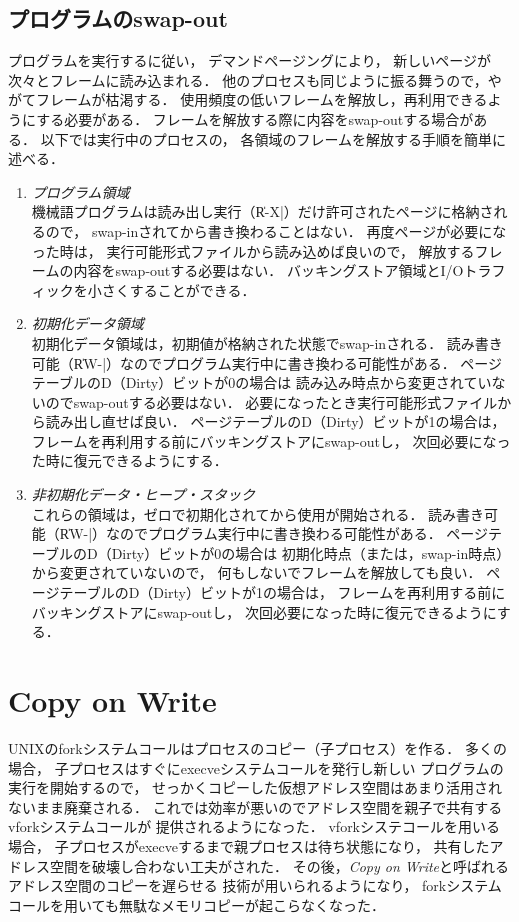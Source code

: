 \subsection{プログラムのswap-out}
プログラムを実行するに従い，
デマンドページングにより，
新しいページが次々とフレームに読み込まれる．
他のプロセスも同じように振る舞うので，やがてフレームが枯渇する．
使用頻度の低いフレームを解放し，再利用できるようにする必要がある．
フレームを解放する際に内容をswap-outする場合がある．
以下では実行中のプロセスの，
各領域のフレームを解放する手順を簡単に述べる．

\begin{enumerate}
\item \emph{プログラム領域} \\
機械語プログラムは読み出し実行（\|R-X|）だけ許可されたページに格納されるので，
swap-inされてから書き換わることはない．
再度ページが必要になった時は，
実行可能形式ファイルから読み込めば良いので，
解放するフレームの内容をswap-outする必要はない．
バッキングストア領域とI/Oトラフィックを小さくすることができる．

\item \emph{初期化データ領域} \\
初期化データ領域は，初期値が格納された状態でswap-inされる．
読み書き可能（\|RW-|）なのでプログラム実行中に書き換わる可能性がある．
ページテーブルのD（Dirty）ビットが0の場合は
読み込み時点から変更されていないのでswap-outする必要はない．
必要になったとき実行可能形式ファイルから読み出し直せば良い．
ページテーブルのD（Dirty）ビットが1の場合は，
フレームを再利用する前にバッキングストアにswap-outし，
次回必要になった時に復元できるようにする．

\item \emph{非初期化データ・ヒープ・スタック} \\
これらの領域は，ゼロで初期化されてから使用が開始される．
読み書き可能（\|RW-|）なのでプログラム実行中に書き換わる可能性がある．
ページテーブルのD（Dirty）ビットが0の場合は
初期化時点（または，swap-in時点）から変更されていないので，
何もしないでフレームを解放しても良い．
ページテーブルのD（Dirty）ビットが1の場合は，
フレームを再利用する前にバッキングストアにswap-outし，
次回必要になった時に復元できるようにする．
\end{enumerate}

\section{Copy on Write}
UNIXのforkシステムコールはプロセスのコピー（子プロセス）を作る．
多くの場合，
子プロセスはすぐにexecveシステムコールを発行し新しい
プログラムの実行を開始するので，
せっかくコピーした仮想アドレス空間はあまり活用されないまま廃棄される．
これでは効率が悪いのでアドレス空間を親子で共有するvforkシステムコールが
提供されるようになった．
vforkシステコールを用いる場合，
子プロセスがexecveするまで親プロセスは待ち状態になり，
共有したアドレス空間を破壊し合わない工夫がされた．
その後，\emph{Copy on Write}と呼ばれるアドレス空間のコピーを遅らせる
技術が用いられるようになり，
forkシステムコールを用いても無駄なメモリコピーが起こらなくなった．

